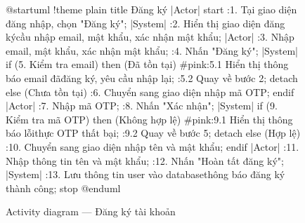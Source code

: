\documentclass[12pt,a4paper]{report}
\begin{document}
\begin{figure}[H]
    \centering
    \begin{plantuml}
        @startuml
        !theme plain
        title Đăng ký
        |Actor|
        start
        :1. Tại giao diện đăng nhập, chọn "Đăng ký";
        |System|
        :2. Hiển thị giao diện đăng ký cầu nhập email, mật khẩu, xác nhận mật khẩu;
        |Actor|
        :3. Nhập email, mật khẩu, xác nhận mật khẩu;
        :4. Nhấn "Đăng ký";
        |System|
        if (5. Kiểm tra email) then (Đã tồn tại)
          #pink:5.1 Hiển thị thông báo email đã đăng ký, yêu cầu nhập lại;
          :5.2 Quay về bước 2;
          detach
        else (Chưa tồn tại)
          :6. Chuyển sang giao diện nhập mã OTP;
        endif
        |Actor|
        :7. Nhập mã OTP;
        :8. Nhấn "Xác nhận";
        |System|
        if (9. Kiểm tra mã OTP) then (Không hợp lệ)
          #pink:9.1 Hiển thị thông báo lỗi thực OTP thất bại;
          :9.2 Quay về bước 5;
          detach
        else (Hợp lệ)
          :10. Chuyển sang giao diện nhập tên và mật khẩu;
        endif
        |Actor|
        :11. Nhập thông tin tên và mật khẩu;
        :12. Nhấn "Hoàn tất đăng ký";
        |System|
        :13. Lưu thông tin user vào database thông báo đăng ký thành công;
        stop
        @enduml
    \end{plantuml}
    \caption{Activity diagram --- Đăng ký tài khoản}
\end{figure}
\end{document}
